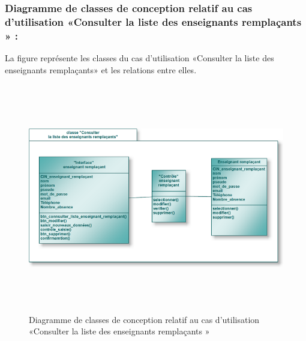 \documentclass[12 pt ]{report}
\begin{document}
\subsubsection{Diagramme de classes de conception relatif au cas d’utilisation «Consulter la liste des enseignants remplaçants » :}
La figure  représente les classes du cas d’utilisation «Consulter la liste des enseignants remplaçants» et les relations entre elles.
\begin{figure}[h]
 \begin{center}
\includegraphics[width= 14 cm ,height= 10cm]{cer.PNG}
\caption{Diagramme de classes de conception relatif au cas d’utilisation «Consulter la liste des enseignants remplaçants » }

\end{center}
\end{figure}
\newpage
\end{document}
